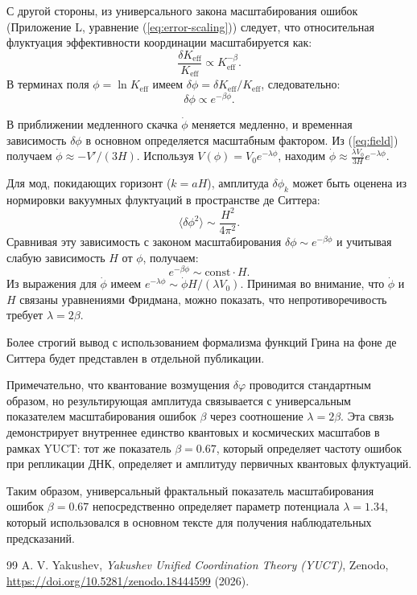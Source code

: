 \documentclass[12pt,a4paper]{article}
\theoremstyle{remark}
\newcommand{\Keff}{K_{\mathrm{eff}}}
\begin{document}
	С другой стороны, из универсального закона масштабирования ошибок (Приложение L, уравнение (\ref{eq:error-scaling})) следует, что относительная флуктуация эффективности координации масштабируется как:
	\begin{equation}
		\frac{\delta\Keff}{\Keff} \propto \Keff^{-\beta}.
	\end{equation}
	В терминах поля $\phi = \ln\Keff$ имеем $\delta\phi = \delta\Keff/\Keff$, следовательно:
	\begin{equation}
		\delta\phi \propto e^{-\beta\phi}.
	\end{equation}
	
	В приближении медленного скачка $\dot{\phi}$ меняется медленно, и временная зависимость $\delta\phi$ в основном определяется масштабным фактором. Из (\ref{eq:field}) получаем $\dot{\phi} \approx -V'/(3H)$. Используя $V(\phi) = V_0 e^{-\lambda\phi}$, находим $\dot{\phi} \approx \frac{\lambda V_0}{3H} e^{-\lambda\phi}$.
	
	Для мод, покидающих горизонт ($k = aH$), амплитуда $\delta\phi_k$ может быть оценена из нормировки вакуумных флуктуаций в пространстве де Ситтера:
	\begin{equation}
		\langle \delta\phi^2 \rangle \sim \frac{H^2}{4\pi^2}.
	\end{equation}
	Сравнивая эту зависимость с законом масштабирования $\delta\phi \sim e^{-\beta\phi}$ и учитывая слабую зависимость $H$ от $\phi$, получаем:
	\begin{equation}
		e^{-\beta\phi} \sim \text{const} \cdot H.
	\end{equation}
	Из выражения для $\dot{\phi}$ имеем $e^{-\lambda\phi} \sim \dot{\phi} H / (\lambda V_0)$. Принимая во внимание, что $\dot{\phi}$ и $H$ связаны уравнениями Фридмана, можно показать, что непротиворечивость требует $\lambda = 2\beta$.
	
	Более строгий вывод с использованием формализма функций Грина на фоне де Ситтера будет представлен в отдельной публикации.
	
	Примечательно, что квантование возмущения $\delta\varphi$ проводится стандартным образом, но результирующая амплитуда связывается с универсальным показателем масштабирования ошибок $\beta$ через соотношение $\lambda = 2\beta$. Эта связь демонстрирует внутреннее единство квантовых и космических масштабов в рамках YUCT: тот же показатель $\beta = 0.67$, который определяет частоту ошибок при репликации ДНК, определяет и амплитуду первичных квантовых флуктуаций.
	
	Таким образом, универсальный фрактальный показатель масштабирования ошибок $\beta = 0.67$ непосредственно определяет параметр потенциала $\lambda = 1.34$, который использовался в основном тексте для получения наблюдательных предсказаний.
	
	\begin{thebibliography}{99}
		A. V. Yakushev, \emph{Yakushev Unified Coordination Theory (YUCT)}, Zenodo, \url{https://doi.org/10.5281/zenodo.18444599} (2026).
	\end{thebibliography}
	
\end{document}
